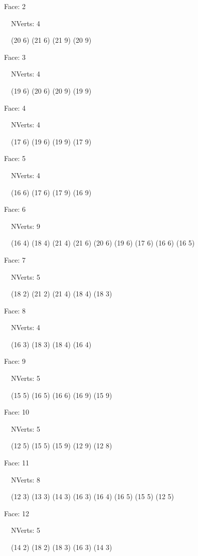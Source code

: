 \documentclass{article}
\begin{document}
{\footnotesize 

Face: 2

\   \    NVerts: 4

 \   \   (20 6) (21 6) (21 9) (20 9)}

{\footnotesize 

Face: 3

\   \    NVerts: 4

 \   \   (19 6) (20 6) (20 9) (19 9)}

{\footnotesize 

Face: 4

\   \    NVerts: 4

 \   \   (17 6) (19 6) (19 9) (17 9)}

{\footnotesize 

Face: 5

\   \    NVerts: 4

 \   \   (16 6) (17 6) (17 9) (16 9)}

{\footnotesize 

Face: 6

\   \    NVerts: 9

 \   \   (16 4) (18 4) (21 4) (21 6) (20 6) (19 6) (17 6) (16 6) (16 5)}

{\footnotesize 

Face: 7

\   \    NVerts: 5

 \   \   (18 2) (21 2) (21 4) (18 4) (18 3)}

{\footnotesize 

Face: 8

\   \    NVerts: 4

 \   \   (16 3) (18 3) (18 4) (16 4)}

{\footnotesize 

Face: 9

\   \    NVerts: 5

 \   \   (15 5) (16 5) (16 6) (16 9) (15 9)}

{\footnotesize 

Face: 10

\   \    NVerts: 5

 \   \   (12 5) (15 5) (15 9) (12 9) (12 8)}

{\footnotesize 

Face: 11

\   \    NVerts: 8

 \   \   (12 3) (13 3) (14 3) (16 3) (16 4) (16 5) (15 5) (12 5)}

{\footnotesize 

Face: 12

\   \    NVerts: 5

 \   \   (14 2) (18 2) (18 3) (16 3) (14 3)}
\end{document}
